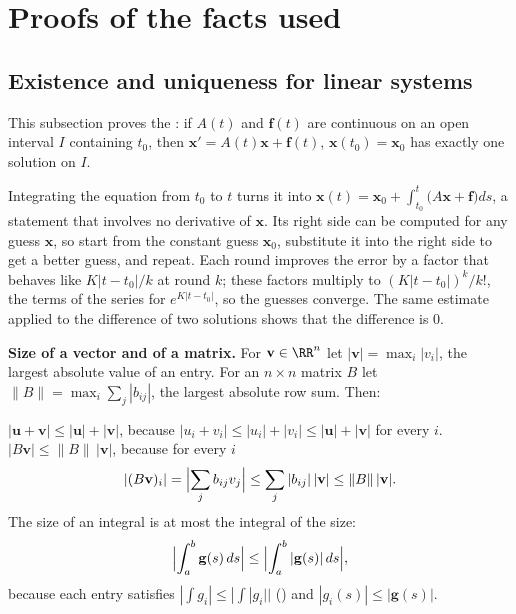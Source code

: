 \documentclass[10pt]{scrartcl}
\newcommand{\vv}[1]{\mathbf{#1}}
\begin{document}
\section{Proofs of the facts used}

\subsection{Existence and uniqueness for linear systems}
This subsection proves the : if $A(t)$ and $\vv f(t)$ are continuous on an open interval $I$ containing $t_0$, then $\vv x'=A(t)\vv x+\vv f(t)$, $\vv x(t_0)=\vv x_0$ has exactly one solution on $I$.

\begin{ideabox}
  Integrating the equation from $t_0$ to $t$ turns it into $\vv x(t)=\vv x_0+\int_{t_0}^t\bigl(A\vv x+\vv f\bigr)ds$, a statement that involves no derivative of $\vv x$. Its right side can be computed for any guess $\vv x$, so start from the constant guess $\vv x_0$, substitute it into the right side to get a better guess, and repeat. Each round improves the error by a factor that behaves like $K|t-t_0|/k$ at round $k$; these factors multiply to $(K|t-t_0|)^k/k!$, the terms of the series for $e^{K|t-t_0|}$, so the guesses converge. The same estimate applied to the difference of two solutions shows that the difference is $0$.
\end{ideabox}

\noindent\textbf{Size of a vector and of a matrix.} For $\vv v\in\RR^n$ let $|\vv v|=\max_i|v_i|$, the largest absolute value of an entry. For an $n\times n$ matrix $B$ let $\|B\|=\max_i\sum_j|b_{ij}|$, the largest absolute row sum. Then:
\begin{itemize}
  \ii $|\vv u+\vv v|\le|\vv u|+|\vv v|$, because $|u_i+v_i|\le|u_i|+|v_i|\le|\vv u|+|\vv v|$ for every $i$.
  \ii $|B\vv v|\le\|B\|\,|\vv v|$, because for every $i$
  \[
    |(B\vv v)_i|=\Bigl|\sum_j b_{ij}v_j\Bigr|\le\sum_j|b_{ij}|\,|\vv v|\le\|B\|\,|\vv v|.
  \]
  \ii The size of an integral is at most the integral of the size:
  \[
    \Bigl|\int_a^b\vv g(s)\,ds\Bigr|\le\Bigl|\int_a^b|\vv g(s)|\,ds\Bigr|,
  \]
  because each entry satisfies $|\int g_i|\le|\int|g_i||$ () and $|g_i(s)|\le|\vv g(s)|$.
\end{itemize}
\end{document}
